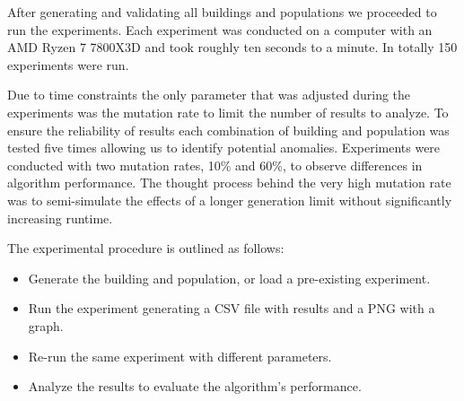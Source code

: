 After generating and validating all buildings and populations we proceeded to run the experiments. Each experiment was conducted on a computer with an AMD Ryzen 7 7800X3D and took roughly ten seconds to a minute. In totally 150 experiments were run.

Due to time constraints the only parameter that was adjusted during the experiments was the mutation rate to limit the number of results to analyze.
To ensure the reliability of results each combination of building and population was tested five times allowing us to identify potential anomalies. Experiments were conducted with two mutation rates, 10\% and 60\%, to observe differences in algorithm performance.
The thought process behind the very high mutation rate was to semi-simulate the effects of a longer generation limit without significantly increasing runtime.

The experimental procedure is outlined as follows:

\begin{itemize}
	\item Generate the building and population, or load a pre-existing experiment.
	\item Run the experiment generating a CSV file with results and a PNG with a graph.
	\item Re-run the same experiment with different parameters.
	\item Analyze the results to evaluate the algorithm's performance.
\end{itemize}
